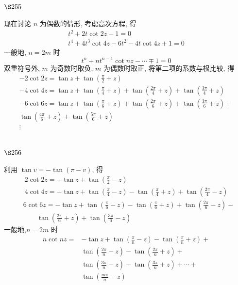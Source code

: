 \section{$\S 255$}

现在讨论 $n$ 为偶数的情形, 考虑高次方程, 得
\[
\begin{gathered}
t^{2}+2 t \cot 2 z-1=0 \\
t^{4}+4 t^{3} \cot 4 z-6 t^{2}-4 t \cot 4 z+1=0
\end{gathered}
\]
一般地, $n=2 m$ 时
\[
t^{n}+n t^{n-1} \cot n z-\cdots \mp 1=0
\]
双重符号外, $m$ 为奇数时取负, $m$ 为偶数时取正, 将第二项的系数与根比较, 得
\[
\begin{gathered}
-2 \cot 2 z=\tan z+\tan \left(\frac{\pi}{2}+z\right) \\
-4 \cot 4 z=\tan z+\tan \left(\frac{\pi}{4}+z\right)+\tan \left(\frac{2 \pi}{4}+z\right)+\tan \left(\frac{3 \pi}{4}+z\right) \\
-6 \cot 6 z=\tan z+\tan \left(\frac{\pi}{6}+z\right)+\tan \left(\frac{2 \pi}{6}+z\right)+\tan \left(\frac{3 \pi}{6}+z\right)+ \\
\tan \left(\frac{4 \pi}{6}+z\right)+\tan \left(\frac{5 \pi}{6}+z\right) \\
\vdots
\end{gathered}
\]
\section{$\S 256$}

利用 $\tan v=-\tan (\pi-v)$, 得
\[
\begin{gathered}
2 \cot 2 z=-\tan z+\tan \left(\frac{\pi}{2}-z\right) \\
4 \cot 4 z=-\tan z+\tan \left(\frac{\pi}{4}-z\right)-\tan \left(\frac{\pi}{4}+z\right)+\tan \left(\frac{2 \pi}{4}-z\right)
\end{gathered}
\]
\[
\begin{aligned}
& 6 \cot 6 z=-\tan z+\tan \left(\frac{\pi}{6}-z\right)-\tan \left(\frac{\pi}{6}+z\right)+\tan \left(\frac{2 \pi}{6}-z\right)- \\
& \qquad \tan \left(\frac{2 \pi}{6}+z\right)+\tan \left(\frac{3 \pi}{6}-z\right)
\end{aligned}
\]
一般地,$n=2 m$ 时
\[
\begin{aligned}
n \cot n z= & -\tan z+\tan \left(\frac{\pi}{n}-z\right)-\tan \left(\frac{\pi}{n}+z\right)+ \\
& \tan \left(\frac{2 \pi}{n}-z\right)-\tan \left(\frac{2 \pi}{n}+z\right)+ \\
& \tan \left(\frac{3 \pi}{n}-z\right)-\tan \left(\frac{3 \pi}{n}+z\right)+\cdots+ \\
& \tan \left(\frac{m \pi}{n}-z\right)
\end{aligned}
\]
